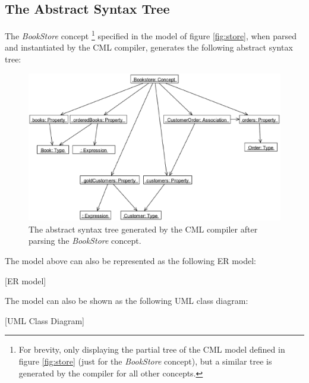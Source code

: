 \subsection{The Abstract Syntax Tree}\label{subsec:ast}

The \emph{BookStore} concept
\footnote{For brevity,
only displaying the partial tree of the CML model defined in figure \ref{fig:store} (just for the \emph{BookStore} concept), 
but a similar tree is generated by the compiler for all other concepts.}
specified in the model of figure \ref{fig:store},
when parsed and instantiated by the CML compiler,
generates the following abstract syntax tree:

\label{fig:ast}
\begin{figure}
\centering
\includegraphics[width=\textwidth]{language/figure-ast}
\caption{The abstract syntax tree generated by the CML compiler after parsing the \emph{BookStore} concept.}
\end{figure}

The model above can also be represented as the following ER model:

[ER model]

The model can also be shown as the following UML class diagram:

[UML Class Diagram]

